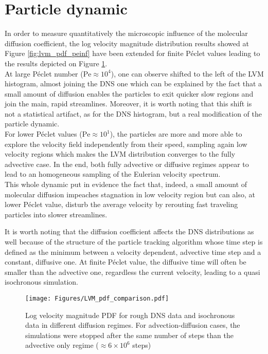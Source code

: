\section{Particle dynamic}
In order to measure quantitatively the microscopic influence of the molecular diffusion coefficient, the log velocity magnitude distribution results showed at Figure \ref{fig:lvm_pdf_peinf} have been extended for finite Péclet values leading to the results depicted on Figure \ref{fig:lvm_pdf_pe}.\\
At large Péclet number ($\mathrm{Pe}\approx 10^4$), one can observe shifted to the left of the LVM histogram, almost joining the DNS one which can be explained by the fact that a small amount of diffusion enables the particles to exit quicker slow regions and join the main, rapid streamlines.
Moreover, it is worth noting that this shift is not a statistical artifact, as for the DNS histogram, but a real modification of the particle dynamic.\\
For lower Péclet values ($\mathrm{Pe}\approx10^1$), the particles are more and more able to explore the velocity field independently from their speed, sampling again low velocity regions which makes the LVM distribution converges to the fully advective case.
In the end, both fully advective or diffusive regimes appear to lead to an homogeneous sampling of the Eulerian velocity spectrum.\\
This whole dynamic put in evidence the fact that, indeed, a small amount of molecular diffusion impeaches stagnation in low velocity region but can also, at lower Péclet value, disturb the average velocity by rerouting fast traveling particles into slower streamlines.

It is worth noting that the diffusion coefficient affects the DNS distributions as well because of the structure of the particle tracking algorithm whose time step is defined as the minimum between a velocity dependent, advective time step and a constant, diffusive one.
At finite Péclet value, the diffusive time will often be smaller than the advective one, regardless the current velocity, leading to a quasi isochronous simulation.\\
\begin{figure}[h!]
	\centering
	\texttt{[image: Figures/LVM\_pdf\_comparison.pdf]}
	\caption{Log velocity magnitude PDF for rough DNS data and isochronous data in different diffusion regimes. For advection-diffusion cases, the simulations were stopped after the same number of steps than the advective only regime ($\approx6\times 10^6$ steps) }
	\label{fig:lvm_pdf_pe}
\end{figure}

